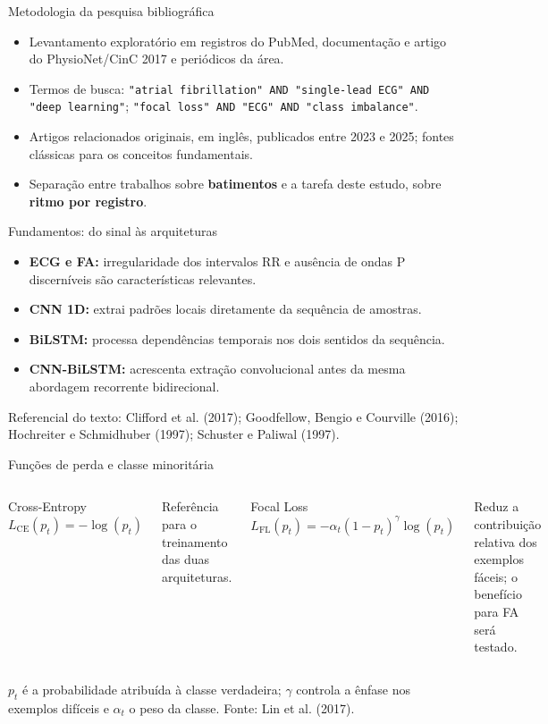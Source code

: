 \documentclass[aspectratio=169,12pt,brazil]{beamer}
\begin{document}
\begin{frame}{Metodologia da pesquisa bibliográfica}
  \begin{itemize}
    \item Levantamento exploratório em registros do PubMed, documentação e artigo do PhysioNet/CinC 2017 e periódicos da área.
    \item Termos de busca: \texttt{"atrial fibrillation" AND "single-lead ECG" AND "deep learning"}; \texttt{"focal loss" AND "ECG" AND "class imbalance"}.
    \item Artigos relacionados originais, em inglês, publicados entre 2023 e 2025; fontes clássicas para os conceitos fundamentais.
    \item Separação entre trabalhos sobre \textbf{batimentos} e a tarefa deste estudo, sobre \textbf{ritmo por registro}.
  \end{itemize}
\end{frame}

\begin{frame}{Fundamentos: do sinal às arquiteturas}
  \begin{itemize}
    \item \textbf{ECG e FA:} irregularidade dos intervalos RR e ausência de ondas P discerníveis são características relevantes.
    \item \textbf{CNN 1D:} extrai padrões locais diretamente da sequência de amostras.
    \item \textbf{BiLSTM:} processa dependências temporais nos dois sentidos da sequência.
    \item \textbf{CNN-BiLSTM:} acrescenta extração convolucional antes da mesma abordagem recorrente bidirecional.
  \end{itemize}
  {\scriptsize Referencial do texto: Clifford et al. (2017); Goodfellow, Bengio e Courville (2016); Hochreiter e Schmidhuber (1997); Schuster e Paliwal (1997).}
\end{frame}

\begin{frame}{Funções de perda e classe minoritária}
  \begin{columns}[T]
    \begin{block}{Cross-Entropy}
      \centering $L_{\mathrm{CE}}(p_t)=-\log(p_t)$
    \end{block}
    \small Referência para o treinamento das duas arquiteturas.
    \begin{block}{Focal Loss}
      \centering $L_{\mathrm{FL}}(p_t)=-\alpha_t(1-p_t)^\gamma\log(p_t)$
    \end{block}
    \small Reduz a contribuição relativa dos exemplos fáceis; o benefício para FA será testado.
  \end{columns}
  \vspace{.25cm}
  \small $p_t$ é a probabilidade atribuída à classe verdadeira; $\gamma$ controla a ênfase nos exemplos difíceis e $\alpha_t$ o peso da classe.
  \vfill {\scriptsize Fonte: Lin et al. (2017).}
\end{frame}
\end{document}
